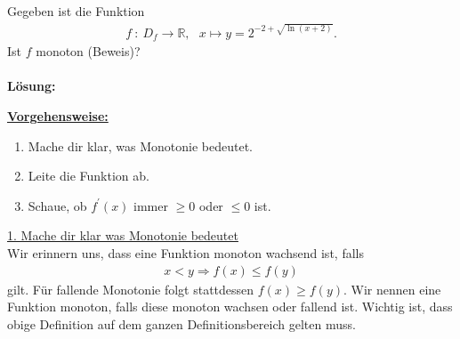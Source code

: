 \newpage

\subsection*{}
Gegeben ist die Funktion
\begin{align*}
f \ : \ D_f \to \mathbb{R}, \ \ \
x \mapsto y = 2^{-2 + \sqrt{\ln(x+2)}}. 
\end{align*}
Ist $f$ monoton (Beweis)?
\\
\\
\textbf{Lösung:}
\begin{mdframed}
\underline{\textbf{Vorgehensweise:}}
\begin{enumerate}
\item Mache dir klar, was Monotonie bedeutet.
\item Leite die Funktion ab.
\item Schaue, ob $f^\prime(x)$ immer $\geq 0$ oder $\leq 0$ ist.
\end{enumerate}
\end{mdframed}

\underline{1. Mache dir klar was Monotonie bedeutet}\\
Wir erinnern uns, dass eine Funktion monoton wachsend ist, falls
\begin{align*}
x < y \Rightarrow f(x) \leq f(y)
\end{align*}
gilt. Für fallende Monotonie folgt stattdessen $f(x) \geq f(y)$.
Wir nennen eine Funktion monoton, falls diese monoton wachsen oder fallend ist.
Wichtig ist, dass obige Definition auf dem ganzen Definitionsbereich gelten muss.\\
\\



